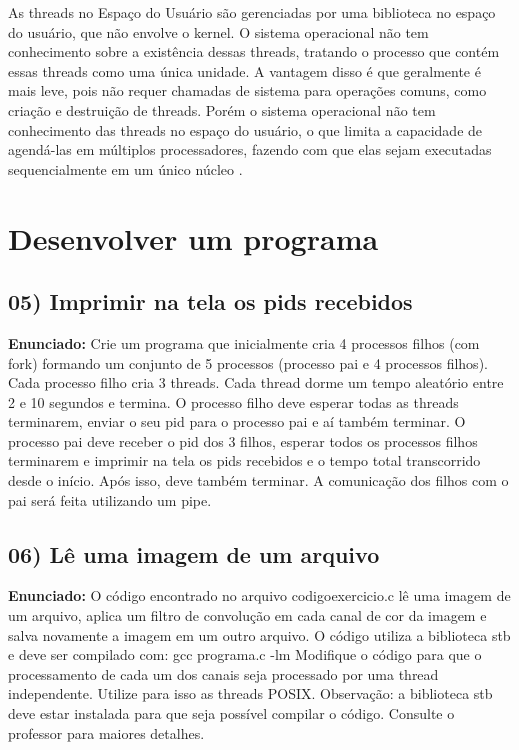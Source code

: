 \documentclass{article}
\begin{document}
As threads no Espaço do Usuário são gerenciadas por uma biblioteca no espaço do usuário, que não envolve o kernel. O sistema operacional não tem conhecimento sobre a existência dessas threads, tratando o processo que contém essas threads como uma única unidade. A vantagem disso é que geralmente é mais leve, pois não requer chamadas de sistema para operações comuns, como criação e destruição de threads. Porém o sistema operacional não tem conhecimento das threads no espaço do usuário, o que limita a capacidade de agendá-las em múltiplos processadores, fazendo com que elas sejam executadas sequencialmente em um único núcleo \cite{geeksforgeeks2024}.


\section{Desenvolver um programa}
\subsection{05) Imprimir na tela os pids recebidos}
\textbf{Enunciado:} Crie um programa que inicialmente cria 4 processos filhos (com fork) formando um conjunto de 5 processos (processo pai e 4 processos filhos). Cada processo filho cria 3 threads. Cada thread dorme um tempo aleatório entre 2 e 10 segundos e termina. O processo filho deve esperar todas as threads terminarem, enviar o seu pid para o processo pai e aí também terminar. O processo pai deve receber o pid dos 3 filhos, esperar todos os processos filhos terminarem e imprimir na tela os pids recebidos e o tempo total transcorrido desde o início. Após isso, deve também terminar. A comunicação dos filhos com o pai será feita utilizando um pipe.\newline

\subsection{06) Lê uma imagem de um arquivo}
\textbf{Enunciado:} O código encontrado no arquivo codigoexercicio.c lê uma imagem de um arquivo, aplica um filtro de convolução em cada canal de cor da imagem e salva novamente a imagem em um outro arquivo. O código utiliza a biblioteca stb e deve ser compilado com: gcc programa.c -lm Modifique o código para que o processamento de cada um dos canais seja processado por uma thread independente. Utilize para isso as threads POSIX. Observação: a biblioteca stb deve estar instalada para que seja possível compilar o código. Consulte o professor para maiores detalhes.\newline

\printbibliography %
\end{document}
